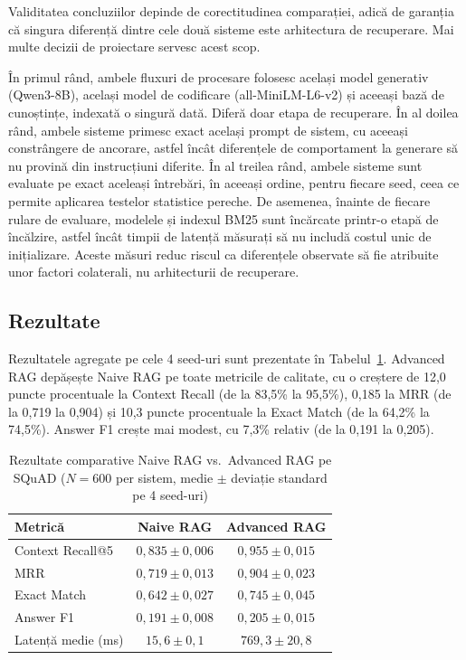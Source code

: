 Validitatea concluziilor depinde de corectitudinea comparației, adică de garanția că singura diferență dintre cele două sisteme este arhitectura de recuperare. Mai multe decizii de proiectare servesc acest scop.

În primul rând, ambele fluxuri de procesare folosesc același model generativ (Qwen3-8B), același model de codificare (all-MiniLM-L6-v2) și aceeași bază de cunoștințe, indexată o singură dată. Diferă doar etapa de recuperare. În al doilea rând, ambele sisteme primesc exact același prompt de sistem, cu aceeași constrângere de ancorare, astfel încât diferențele de comportament la generare să nu provină din instrucțiuni diferite. În al treilea rând, ambele sisteme sunt evaluate pe exact aceleași întrebări, în aceeași ordine, pentru fiecare seed, ceea ce permite aplicarea testelor statistice pereche. De asemenea, înainte de fiecare rulare de evaluare, modelele și indexul BM25 sunt încărcate printr-o etapă de încălzire, astfel încât timpii de latență măsurați să nu includă costul unic de inițializare. Aceste măsuri reduc riscul ca diferențele observate să fie atribuite unor factori colaterali, nu arhitecturii de recuperare.

\subsection{Rezultate}

Rezultatele agregate pe cele 4 seed-uri sunt prezentate în Tabelul~\ref{tab:rezultate}. Advanced RAG depășește Naive RAG pe toate metricile de calitate, cu o creștere de 12,0 puncte procentuale la Context Recall (de la 83,5\% la 95,5\%), 0,185 la MRR (de la 0,719 la 0,904) și 10,3 puncte procentuale la Exact Match (de la 64,2\% la 74,5\%). Answer F1 crește mai modest, cu 7,3\% relativ (de la 0,191 la 0,205).

\begin{table}[ht]
\centering
\begin{tabular}{lcc}
\toprule
\textbf{Metrică} & \textbf{Naive RAG} & \textbf{Advanced RAG} \\
\midrule
Context Recall@5   & $0{,}835 \pm 0{,}006$ & $0{,}955 \pm 0{,}015$ \\
MRR                & $0{,}719 \pm 0{,}013$ & $0{,}904 \pm 0{,}023$ \\
Exact Match        & $0{,}642 \pm 0{,}027$ & $0{,}745 \pm 0{,}045$ \\
Answer F1          & $0{,}191 \pm 0{,}008$ & $0{,}205 \pm 0{,}015$ \\
Latență medie (ms) & $15{,}6  \pm 0{,}1$   & $769{,}3 \pm 20{,}8$  \\
\bottomrule
\end{tabular}
\caption{Rezultate comparative Naive RAG vs.\ Advanced RAG pe SQuAD ($N=600$ per sistem, medie $\pm$ deviație standard pe 4 seed-uri)}
\label{tab:rezultate}
\end{table}


